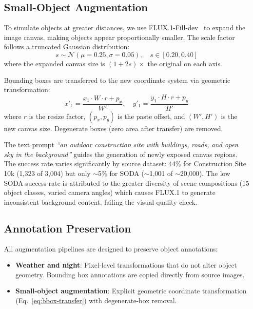 \documentclass[12pt]{article}
\begin{document}
\subsection{Small-Object Augmentation}

To simulate objects at greater distances, we use FLUX.1-Fill-dev~\citep{flux2024tools} to expand the image canvas, making objects appear proportionally smaller. The scale factor follows a truncated Gaussian distribution:
\begin{equation}
    s \sim \mathcal{N}(\mu=0.25, \sigma=0.05), \quad s \in [0.20, 0.40]
\end{equation}
where the expanded canvas size is $(1 + 2s) \times$ the original on each axis.

Bounding boxes are transferred to the new coordinate system via geometric transformation:
\begin{equation}
    \label{eq:bbox-transfer}
    x'_1 = \frac{x_1 \cdot W \cdot r + p_x}{W'}, \quad
    y'_1 = \frac{y_1 \cdot H \cdot r + p_y}{H'}
\end{equation}
where $r$ is the resize factor, $(p_x, p_y)$ is the paste offset, and $(W', H')$ is the new canvas size. Degenerate boxes (zero area after transfer) are removed.

The text prompt \textit{``an outdoor construction site with buildings, roads, and open sky in the background''} guides the generation of newly exposed canvas regions. The success rate varies significantly by source dataset: 44\% for Construction Site 10k (1,323 of 3,004) but only $\sim$5\% for SODA ($\sim$1,001 of $\sim$20,000). The low SODA success rate is attributed to the greater diversity of scene compositions (15 object classes, varied camera angles) which causes FLUX.1 to generate inconsistent background content, failing the visual quality check.

\subsection{Annotation Preservation}

All augmentation pipelines are designed to preserve object annotations:

\begin{itemize}[noitemsep]
    \item \textbf{Weather and night}: Pixel-level transformations that do not alter object geometry. Bounding box annotations are copied directly from source images.
    \item \textbf{Small-object augmentation}: Explicit geometric coordinate transformation (Eq.~\ref{eq:bbox-transfer}) with degenerate-box removal.
\end{itemize}
\end{document}
